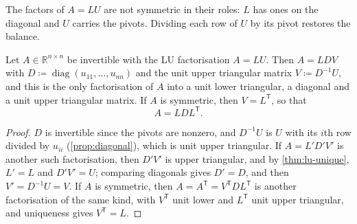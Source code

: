 The factors of $A=LU$ are not symmetric in their roles: $L$ has ones on the diagonal and $U$ carries the pivots. Dividing each row of $U$ by its pivot restores the balance.

\begin{proposition}
\label{prop:ldu}
Let $A\in\mathbb R^{n\times n}$ be invertible with the LU factorisation $A=LU$. Then $A=LDV$ with $D\coloneqq\operatorname{diag}(u_{11},\ldots,u_{nn})$ and the unit upper triangular matrix $V\coloneqq D^{-1}U$, and this is the only factorisation of $A$ into a unit lower triangular, a diagonal and a unit upper triangular matrix. If $A$ is symmetric, then $V=L^{\mathsf T}$, so that
\[
A=LDL^{\mathsf T}.
\]
\end{proposition}

\begin{proof}
$D$ is invertible since the pivots are nonzero, and $D^{-1}U$ is $U$ with its $i$th row divided by $u_{ii}$ (\cref{prop:diagonal}), which is unit upper triangular. If $A=L'D'V'$ is another such factorisation, then $D'V'$ is upper triangular, and by \cref{thm:lu-unique}, $L'=L$ and $D'V'=U$; comparing diagonals gives $D'=D$, and then $V'=D^{-1}U=V$. If $A$ is symmetric, then $A=A^{\mathsf T}=V^{\mathsf T}DL^{\mathsf T}$ is another factorisation of the same kind, with $V^{\mathsf T}$ unit lower and $L^{\mathsf T}$ unit upper triangular, and uniqueness gives $V^{\mathsf T}=L$.
\end{proof}

